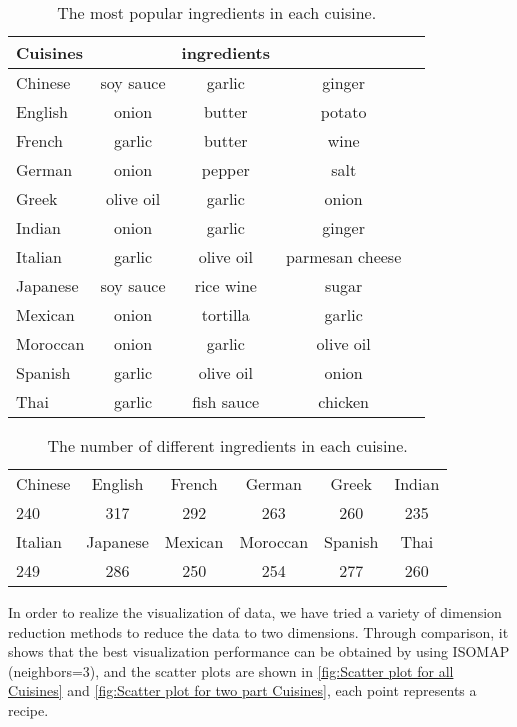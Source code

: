 \documentclass{article}
\begin{document}
\begin{table}[htb]
\vskip -3mm
\begin{center}
\begin{tabular}{lcccc}
\hline
Cuisines &  & ingredients \\
\hline
Chinese & soy sauce & garlic & ginger \\
English & onion & butter & potato \\
French & garlic & butter & wine \\
German & onion & pepper & salt \\
Greek & olive oil & garlic & onion \\
Indian & onion & garlic & ginger \\
Italian & garlic & olive oil & parmesan cheese \\
Japanese & soy sauce & rice wine & sugar \\
Mexican & onion & tortilla & garlic \\
Moroccan & onion & garlic & olive oil \\
Spanish & garlic & olive oil & onion \\
Thai & garlic & fish sauce & chicken \\
\hline
\end{tabular}
\vskip 0.5mm
\caption{The most popular ingredients in each cuisine.}
\label{popular ingredients in each cuisine}
\end{center}
\vskip -9mm
\end{table}

\begin{table}[htb]
\vskip 2mm
\begin{center}
\begin{tabular}{lccccc}
\hline
Chinese & English & French & German & Greek & Indian\\
240 & 317 & 292 & 263 & 260 & 235\\
\hline
Italian & Japanese & Mexican & Moroccan & Spanish & Thai\\
249 & 286 & 250 & 254 & 277 & 260\\
\hline
\end{tabular}
\vskip 1mm
\caption{The number of different ingredients in each cuisine.}
\label{The number of different ingredients in each cuisine}
\end{center}
\vskip -9mm
\end{table}

In order to realize the visualization of data, we have tried a variety of dimension reduction methods to reduce the data to two dimensions. Through comparison, it shows that the best visualization performance can be obtained by using ISOMAP (neighbors=3), and the scatter plots are shown in \autoref{fig:Scatter plot for all Cuisines} and \autoref{fig:Scatter plot for two part Cuisines}, each point represents a recipe.
\end{document}
